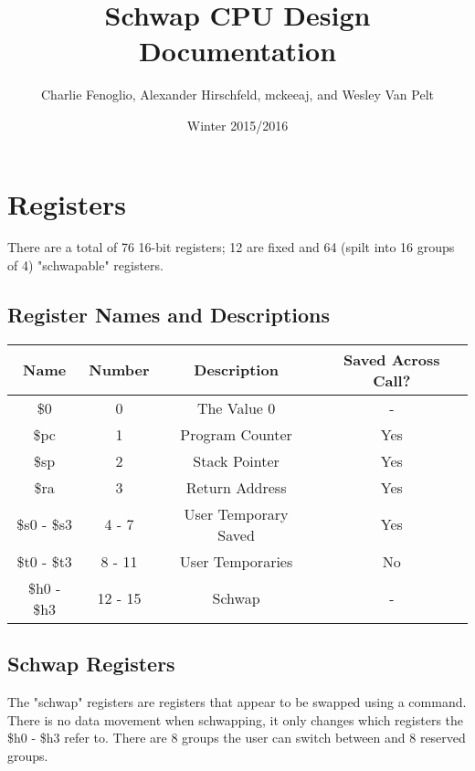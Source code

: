 \documentclass{article}
\title{Schwap CPU Design Documentation}
\author{Charlie Fenoglio, Alexander Hirschfeld, mckeeaj, and Wesley Van Pelt}
\date{Winter 2015/2016}
\begin{document}
\maketitle
\section{Registers}
	There are a total of 76 16-bit registers; 12 are fixed and 64 (spilt into 16 groups of 4) "schwapable" registers.
	
	\subsection{Register Names and Descriptions}
		\begin{center}
			\begin{tabular}{| c | c | c | c |}
				\hline
				    Name        & Number  & Description      & Saved Across Call? \\ \hline
				    \$0         & 0       & The Value 0      & -   \\ \hline
				    \$pc        & 1       & Program Counter  & Yes \\ \hline
				    \$sp        & 2       & Stack Pointer    & Yes \\ \hline
				    \$ra        & 3       & Return Address   & Yes \\ \hline
				    \$s0 - \$s3 & 4 - 7   & User Temporary Saved & Yes \\ \hline
				    \$t0 - \$t3 & 8 - 11  & User Temporaries & No  \\ \hline
				    \$h0 - \$h3 & 12 - 15 & Schwap           & -   \\ 
				\hline
			\end{tabular}
		\end{center}
	\subsection{Schwap Registers}
		The "schwap" registers are registers that appear to be swapped using a command.  There is no data movement when schwapping, it only changes which registers the \$h0 - \$h3 refer to.  There are 8 groups the user can switch between and 8 reserved groups.
\end{document}
